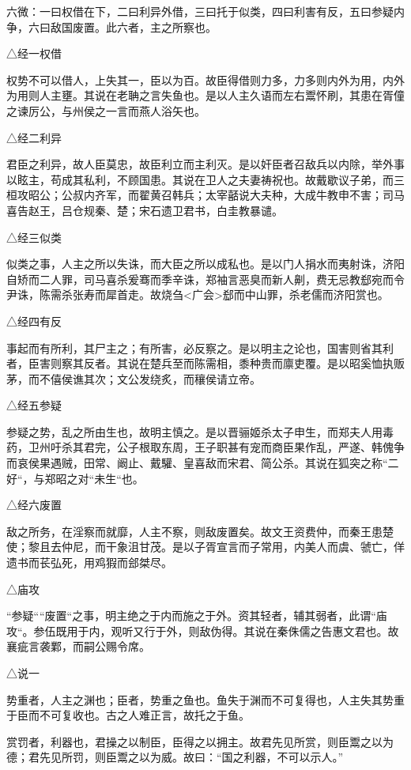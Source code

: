 \documentclass[]{article}
\begin{document}
六微：一曰权借在下，二曰利异外借，三曰托于似类，四曰利害有反，五曰参疑内争，六曰敌国废置。此六者，主之所察也。

△经一权借

权势不可以借人，上失其一，臣以为百。故臣得借则力多，力多则内外为用，内外为用则人主壅。其说在老聃之言失鱼也。是以人主久语而左右鬻怀刷，其患在胥僮之谏厉公，与州侯之一言而燕人浴矢也。

△经二利异

君臣之利异，故人臣莫忠，故臣利立而主利灭。是以奸臣者召敌兵以内除，举外事以眩主，苟成其私利，不顾国患。其说在卫人之夫妻祷祝也。故戴歇议子弟，而三桓攻昭公；公叔内齐军，而翟黄召韩兵；太宰嚭说大夫种，大成牛教申不害；司马喜告赵王，吕仓规秦、楚；宋石遗卫君书，白圭教暴谴。

△经三似类

似类之事，人主之所以失诛，而大臣之所以成私也。是以门人捐水而夷射诛，济阳自矫而二人罪，司马喜杀爰骞而季辛诛，郑袖言恶臭而新人劓，费无忌教郄宛而令尹诛，陈需杀张寿而犀首走。故烧刍\textless{}广会\textgreater{}郄而中山罪，杀老儒而济阳赏也。

△经四有反

事起而有所利，其尸主之；有所害，必反察之。是以明主之论也，国害则省其利者，臣害则察其反者。其说在楚兵至而陈需相，黍种贵而廪吏覆。是以昭奚恤执贩茅，而不僖侯谯其次；文公发绕炙，而穰侯请立帝。

△经五参疑

参疑之势，乱之所由生也，故明主慎之。是以晋骊姬杀太子申生，而郑夫人用毒药，卫州吁杀其君完，公子根取东周，王子职甚有宠而商臣果作乱，严遂、韩傀争而哀侯果遇贼，田常、阚止、戴驩、皇喜敌而宋君、简公杀。其说在狐突之称``二好``，与郑昭之对``未生``也。

△经六废置

敌之所务，在淫察而就靡，人主不察，则敌废置矣。故文王资费仲，而秦王患楚使；黎且去仲尼，而干象沮甘茂。是以子胥宣言而子常用，内美人而虞、虢亡，佯遗书而苌弘死，用鸡猳而郐桀尽。

△庙攻

``参疑````废置``之事，明主绝之于内而施之于外。资其轻者，辅其弱者，此谓``庙攻``。参伍既用于内，观听又行于外，则敌伪得。其说在秦侏儒之告惠文君也。故襄疵言袭鄴，而嗣公赐令席。

△说一

势重者，人主之渊也；臣者，势重之鱼也。鱼失于渊而不可复得也，人主失其势重于臣而不可复收也。古之人难正言，故托之于鱼。

赏罚者，利器也，君操之以制臣，臣得之以拥主。故君先见所赏，则臣鬻之以为德；君先见所罚，则臣鬻之以为威。故曰：``国之利器，不可以示人。''
\end{document}
